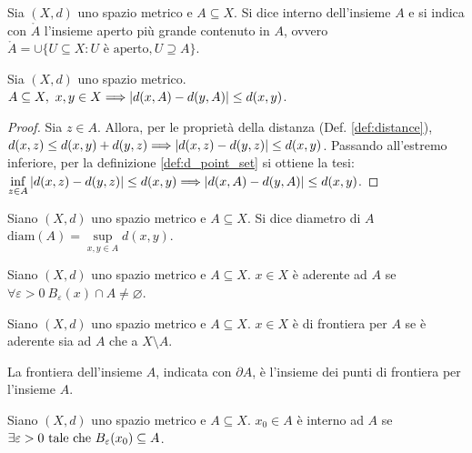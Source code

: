 \begin{definition}
    Sia $(X, d)$ uno spazio metrico e $A \subseteq X$. Si dice interno dell'insieme $A$ e si indica con $\mathring{A}$ l'insieme aperto più grande contenuto in $A$, ovvero $\mathring{A} = \cup\{U\subseteq X: U \text{ è aperto}, U \supseteq A\}$.
\end{definition}

\begin{prop}
    Sia $(X, d)$ uno spazio metrico. $A \subseteq X, \ x,y \in X \Longrightarrow \abs{d(x,A)-d(y,A)}\leq d(x,y)$.
\end{prop}

\begin{proof}
    Sia $z \in A$. Allora, per le proprietà della distanza (Def. \ref{def:distance}), $d(x,z)\leq d(x,y)+d(y,z)\Longrightarrow \abs{d(x,z)-d(y,z)}\leq d(x,y)$. Passando all'estremo inferiore, per la definizione \ref{def:d_point_set} si ottiene la tesi: $\inf\limits_{z\in A}\abs{d(x,z)-d(y,z)}\leq d(x,y)\Longrightarrow \abs{d(x,A)-d(y,A)}\leq d(x,y)$.
\end{proof}

\begin{definition}
    [Diametro]
    Siano $(X,d)$ uno spazio metrico e $A \subseteq X$. Si dice diametro di $A$ $\text{diam}(A)=\sup\limits_{x,y \in A}d(x,y)$.
\end{definition}

\begin{definition}
    Siano $(X,d)$ uno spazio metrico e $A \subseteq X$. $x \in X$ è aderente ad $A$ se $\forall \varepsilon > 0 \ B_\varepsilon(x)\cap A \neq \varnothing$.
\end{definition}

\begin{definition}
    Siano $(X,d)$ uno spazio metrico e $A \subseteq X$. $x \in X$ è di frontiera per $A$ se è aderente sia ad $A$ che a $X \setminus A$.
\end{definition}

\begin{definition}
    [Frontiera]
    La frontiera dell'insieme $A$, indicata con $\partial A$, è l'insieme dei punti di frontiera per l'insieme $A$.
\end{definition}

\begin{definition}
    Siano $(X,d)$ uno spazio metrico e $A \subseteq X$. $x_0 \in A$ è interno ad $A$ se $\exists \varepsilon > 0 \text{ tale che } B_\varepsilon(x_0)\subseteq A$.
\end{definition}

